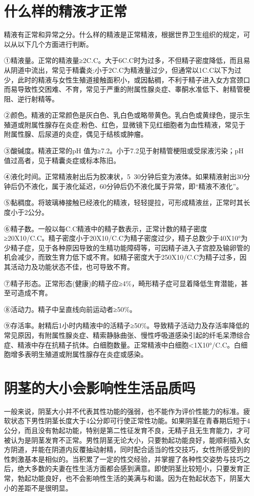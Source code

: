 \documentclass[12pt,UTF8]{ctexbook}
\begin{document}
\section{什么样的精液才正常}

精液有正常和异常之分。什么样的精液是正常精液，根据世界卫生组织的规定，可以从以下几个方面进行判断。

①精液量。正常的精液量≥2C.C。大于6C.C时为过多，不但精子密度降低，而且易从阴道中流出，常见于精囊炎;小于2C.C为精液量过少，但通常以1C.C以下为过少，此时的精液与女性生殖道接触面积小，或因黏稠，不利于精子进入女方宫颈口而易导致性交困难、不育，常见于严重的附属性腺炎症、睾酮水准低下、射精管梗阻、逆行射精等。

②颜色。精液的正常颜色是灰白色、乳白色或略带黄色。乳白色或黄绿色，提示生殖道或附属性腺存在炎症;粉色、红色，显微镜下见红细胞者为血性精液，常见于附属性腺、后尿道的炎症，偶见于结核或肿瘤。

③酸碱度。精液正常的pH 值为≥7.2。小于7.2见于射精管梗阻或受尿液污染；pH值过高者，见于精囊炎症或标本陈旧。

④液化时间。正常精液射出后为胶凍状，5~30分钟后变为液体。如果精液射出30分钟后仍不液化，属于液化延迟，60分钟后仍不液化属于异常，即“精液不液化”。

⑤黏稠度。将玻璃棒接触已经液化的精液，轻轻提拉，可形成精液丝，正常时其长度小于2公分。

⑥精子数。一般以每C.C精液中的精子数表示，正常计数的精子密度≥20X10/C.C。精子密度小于20X10/C.C为精子密度过少，精子总数少于40X10°为少精子症，见于各种原因导致的生精功能障碍等，可因精子进入子宫腔及输卵管的机会减少，而致生育力低下或不育。如精子密度大于250X10/C.C为精子过多，因其活动力及功能状态不佳，也可导致不育。

⑦精子形态。正常形态(健康)的精子应≥4\%，畸形精子症可显着降低生育潜能，甚至可造成不育。

⑧活动力。精子中呈直线向前运动者≥50\%。

⑨存活率。射精后1小时内精液中的活精子≥50\%。导致精子活动力及存活率降低的常见原因，有附属性腺炎症、精索静脉曲张、慢性呼吸道感染引起的纤毛呆滯综合症、精液中存在抗精子抗体。白细胞数量。正常精液中白细胞<1X10°/C.C。白细胞增多表明生殖道或附属性腺存在炎症或感染。

\section{阴茎的大小会影响性生活品质吗}

一般来说，阴茎大小并不代表其性功能的强弱，也不能作为评价性能力的标准。疲软状态下男性阴茎长度大于4公分即可行使正常性功能。如果阴茎在青春期后短于4公分，而且没有勃起功能，特别是第二性征发育不良，无精子且无生育能力，才可被认为是阴茎发育不正常。男性阴茎无论大小，只要勃起功能良好，能顺利插入女方阴道，并能在阴道内反覆抽动射精，同时配合适当的性交技巧，女性所感受到的性刺激基本是相似的。当积累了一定的性交经验，并掌握了各种性交姿势与技巧之后，绝大多数的夫妻在性生活方面都会感到满意。即使阴茎比较短小，只要发育正常，勃起功能良好，也不会影响性生活的美满与和谐。因为在勃起状态下，阴茎大小的差距不是很明显。
\end{document}
